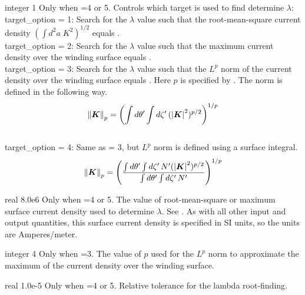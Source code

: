{integer}
{1}
{Only when =4 or 5.}
{Controls which target is used to find determine $\lambda$:\\

{\ttfamily target\_option} = 1: Search for the $\lambda$ value such that the root-mean-square current density
$\left( \int d^2a\; K^2 \right)^{1/2}$ equals .\\

{\ttfamily target\_option} = 2: Search for the $\lambda$ value such that the maximum
current density over the winding surface equals .\\

{\ttfamily target\_option} = 3: Search for the $\lambda$ value such that the $L^p$ norm of the current 
density over the winding surface equals . Here $p$ is specified by 
. The norm is defined in the following way.
\begin{gather}
\norm{\bm{K}}_p = \left( \int d \theta' \int d \zeta' \, (\abs{\bm{K}}^2)^{p/2} \right)^{1/p}
\end{gather}\\

{\ttfamily target\_option} = 4: Same as  = 3, but $L^p$ norm is defined using a
surface integral.
\begin{gather}
\norm{\bm{K}}_p = \left( \frac{\int d \theta' \int d \zeta' \, N' (\abs{\bm{K}}^2)^{p/2}}{\int d \theta' \int d \zeta' \, N'} \right)^{1/p}
\end{gather}
}

\myhrule

{real}
{8.0e6}
{Only when =4 or 5.}
{The value of root-mean-square or maximum surface current density used to determine $\lambda$.
See .
As with all other input and output quantities, this surface current density is specified in SI units,
so the units are Amperes/meter.
}

\myhrule

{integer}
{4}
{Only when =3.}
{The value of $p$ used for the $L^p$ norm to approximate the maximum of the current density over the
winding surface.}

\myhrule

{real}
{1.0e-5}
{Only when =4 or 5.}
{Relative tolerance for the lambda root-finding.}


